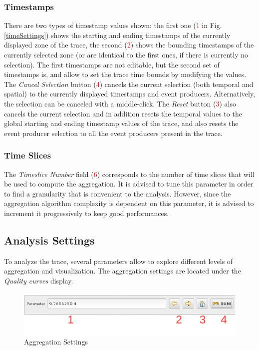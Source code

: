\documentclass[twoside]{article}
\begin{document}
\begin{sloppypar}
\subsubsection{Timestamps}
There are two types of timestamp values shown: the first one (\textcolor{red}{1} in Fig. \ref{timeSettings}) shows the starting and ending timestamps of the currently displayed zone of the trace, the second (\textcolor{red}{2}) shows the bounding timestamps of the currently selected zone (or are identical to the first ones, if there is currently no selection). The first timestamps are not editable, but the second set of timestamps is, and allow to set the trace time bounds by modifying the values. The \textit{Cancel Selection} button (\textcolor{red}{4}) cancels the current selection (both temporal and spatial) to the currently displayed timestamps and event producers. Alternatively, the selection can be canceled with a middle-click. The \textit{Reset} button (\textcolor{red}{3}) also cancels the current selection and in addition resets the temporal values to the global starting and ending timestamp values of the trace, and also resets the event producer selection to all the event producers present in the trace.

\subsubsection{Time Slices}
The \textit{Timeslice Number} field (\textcolor{red}{6}) corresponds to the number of time slices that will be used to compute the aggregation. It is advised to tune this parameter in order to find a granularity that is convenient to the analysis. However, since the aggregation algorithm complexity is dependent on this parameter, it is advised to increment it progressively to keep good performances.

\subsection{Analysis Settings}
To analyze the trace, several parameters allow to explore different levels of aggregation and visualization. The aggregation settings are located under the \textit{Quality curves} display.
 
\begin{figure}[h!]
	\centering
	\includegraphics[scale=1.0]{images/aggregationSettings.pdf}
	\caption{Aggregation Settings}
	\label{aggregSettings}
\end{figure}


\end{sloppypar}
\end{document}
